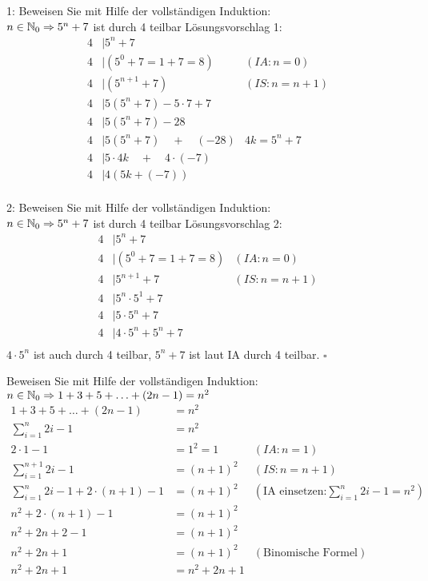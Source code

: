 \begin{card}
  1: Beweisen Sie mit Hilfe der vollständigen Induktion:\\
  $n \in \mathbb{N}_0 \Rightarrow 5^n + 7$ ist durch 4 teilbar
  \hr
  Lösungsvorschlag 1:
  \begin{align*}
    4 &\mid 5^n + 7 \\
    4 &\mid (5^0 + 7 = 1+7 = 8) & (IA: n=0) \\
    4 &\mid (5^{n+1} + 7) & (IS: n=n+1) \\
    4 &\mid 5 (5^n + 7) - 5 \cdot 7 + 7 & \\
    4 &\mid 5 (5^n + 7) - 28 & \\
    4 &\mid 5 (5^n + 7) \quad + \quad (-28) & 4k = 5^n + 7 \\
    4 &\mid 5 \cdot 4k \quad + \quad 4 \cdot (-7) & \\
    4 &\mid 4(5k + (-7)) & \\
  \end{align*}
\end{card}

\begin{card}
  2: Beweisen Sie mit Hilfe der vollständigen Induktion:\\
  $n \in \mathbb{N}_0 \Rightarrow 5^n + 7$ ist durch 4 teilbar
  \hr
  Lösungsvorschlag 2:
  \begin{align*}
    4 &\mid 5^n + 7 \\
    4 &\mid (5^0 + 7 = 1+7 = 8) & (IA: n=0) \\
    4 &\mid 5^{n+1} + 7 & (IS: n=n+1) \\
    4 &\mid 5^n \cdot 5^1 + 7 & \\
    4 &\mid 5 \cdot 5^n + 7 & \\
    4 &\mid 4 \cdot 5^n + 5^n + 7 & \\
  \end{align*}
  $4 \cdot 5^n$ ist auch durch 4 teilbar, $5^n + 7$ ist laut IA durch 4 teilbar. $\square$
\end{card}

\begin{card}
  Beweisen Sie mit Hilfe der vollständigen Induktion:\\
  $n \in \mathbb{N}_0 \Rightarrow 1 + 3 + 5 + \ldots + (2n - 1) = n^2$
  \hr
  \begin{align*}
    1 + 3 + 5 + \ldots + (2n - 1) &= n^2 \\
    \sum\limits_{i=1}^n 2i - 1 &= n^2 \\
    2 \cdot 1 - 1 &= 1^2 = 1 & (IA: n=1) \\
    \sum\limits_{i=1}^{n+1} 2i - 1 &= (n+1)^2 & (IS: n=n+1) \\
    \sum\limits_{i=1}^{n} 2i - 1 + 2 \cdot (n+1) - 1 &= (n+1)^2 & (\text{IA einsetzen:} \sum\limits_{i=1}^n 2i - 1 = n^2)\\
    n^2 + 2 \cdot (n+1) - 1 &= (n+1)^2 & \\
    n^2 + 2n + 2 - 1 &= (n+1)^2 & \\
    n^2 + 2n + 1 &= (n+1)^2 & (\text{Binomische Formel})\\
    n^2 + 2n + 1 &= n^2 + 2n + 1
  \end{align*}
\end{card}

